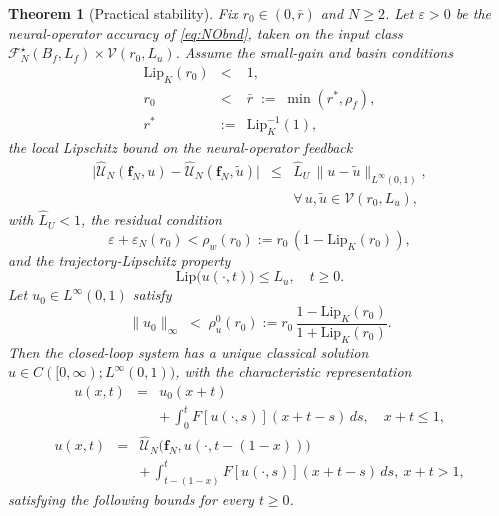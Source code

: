 \documentclass[twocolumn,amsthm]{autart}
\newcommand{\Linf}{L^\infty}
\newcommand{\Lip}{\mathrm{Lip}}
\newcommand{\Lipk}{\mathrm{Lip}_K}
\newcommand{\eps}{\varepsilon}
\theoremstyle{plain}
\newtheorem{theorem}{Theorem}
\theoremstyle{definition}
\begin{document}
\begin{theorem}[Practical stability]
\label{thm:stab}
Fix $r_0 \in (0, \bar r)$ and $N \ge 2$. Let $\eps > 0$ be the neural-operator accuracy of \eqref{eq:NObnd}, taken on the input class $\mathcal{F}_N^\star(B_f,L_f) \times \mathcal{V}(r_0,L_u)$. Assume the small-gain and basin conditions
\begin{eqnarray}
\Lipk(r_0) &<& 1, \nonumber \\
r_0 &<& \bar r \;:=\; \min(r^*, \rho_f), \nonumber \\
r^* &:=& \Lipk^{-1}(1),
\label{eq:cond_Lipk}
\end{eqnarray}
the local Lipschitz bound on the neural-operator feedback
\begin{eqnarray}
\bigl|\widehat{\mathcal{U}}_N(\mathbf{f}_N, u) - \widehat{\mathcal{U}}_N(\mathbf{f}_N, \tilde u)\bigr| &\le& \hat L_U\,\|u - \tilde u\|_{\Linf(0,1)}, \nonumber \\
&& \forall\, u, \tilde u \in \mathcal{V}(r_0, L_u),
\label{eq:NOlip}
\end{eqnarray}
with $\hat L_U < 1$, the residual condition
\begin{equation}
\eps + \eps_N(r_0) < \rho_w(r_0) := r_0\,(1 - \Lipk(r_0)),
\label{eq:cond_resid_NO}
\end{equation}
and the trajectory-Lipschitz property
\begin{equation}
\Lip\bigl(u(\cdot, t)\bigr) \le L_u, \quad t \ge 0.
\label{eq:traj-Lip}
\end{equation}
Let $u_0 \in \Linf(0,1)$ satisfy
\begin{equation}
\|u_0\|_\infty \;<\; \rho_u^0(r_0) := r_0\,\frac{1 - \Lipk(r_0)}{1 + \Lipk(r_0)}.
\label{eq:cond_init_NO}
\end{equation}
Then the closed-loop system has a unique classical solution $u \in C([0,\infty); \Linf(0,1))$, with the characteristic representation
\begin{eqnarray}
u(x,t) &=& u_0(x+t) \nonumber \\
&& +\, \int_0^t F[u(\cdot,s)](x+t-s)\, ds, \quad x + t \le 1,
\label{eq:char-mild-a}
\end{eqnarray}
\begin{eqnarray}
u(x,t) &=& \widehat{\mathcal{U}}_N\bigl(\mathbf{f}_N, u(\cdot, t-(1-x))\bigr) \nonumber \\
&& +\, \int_{t-(1-x)}^t F[u(\cdot,s)](x+t-s)\, ds, \ x + t > 1,
\label{eq:char-mild-b}
\end{eqnarray}
satisfying the following bounds for every $t \ge 0$.
\begin{itemize}

\end{itemize}
\end{theorem}
\end{document}
